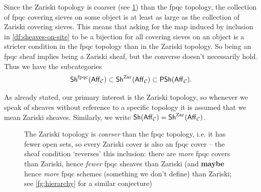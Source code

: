         \bigskip

        Since the Zariski topology is coarser (see \cref{fg:zariski-vs-fpqc-topology}) than the fpqc topology, the collection of fpqc covering sieves on some object is at least as large as the collection of Zariski covering sieves.
        This means that asking for the map induced by inclusion in \cref{df:sheaves-on-site} to be a bijection for all covering sieves on an object is a stricter condition in the fpqc topology than in the Zariski topology.
        So being an fpqc sheaf implies being a Zariski sheaf, but the converse doesn't necessarily hold.
        Thus we have the subcategories
        \begin{equation*}
            \mathsf{Sh}^{\text{fpqc}}(\mathsf{Aff}_{\mathcal{C}})\subset\mathsf{Sh}^{\text{Zar}}(\mathsf{Aff}_{\mathcal{C}})\subset\mathsf{PSh}(\mathsf{Aff}_{\mathcal{C}}).
        \end{equation*}

        \begin{note}
            As already stated, our primary interest is the Zariski topology, so whenever we speak of sheaves without reference to a specific topology it is assumed that we mean Zariski sheaves.
            Similarly, we write $\mathsf{Sh}(\mathsf{Aff}_{\mathcal{C}})=\mathsf{Sh}^{\text{Zar}}(\mathsf{Aff}_{\mathcal{C}})$.
        \end{note}

        \begin{figure}[h]
            \centering
            \caption{The Zariski topology is \emph{coarser} than the fpqc topology, i.e. it has fewer open sets, so every Zariski cover is also an fpqc cover -- the sheaf condition `reverses' this inclusion: there are \emph{more} fpqc covers than Zariski, hence \emph{fewer} fpqc sheaves than Zariski (and \textbf{maybe} hence \emph{more} fpqc schemes (something we don't define) than Zariski; see \cref{fg:hierarchy} for a similar conjecture)}\label{fg:zariski-vs-fpqc-topology}
        \end{figure}

